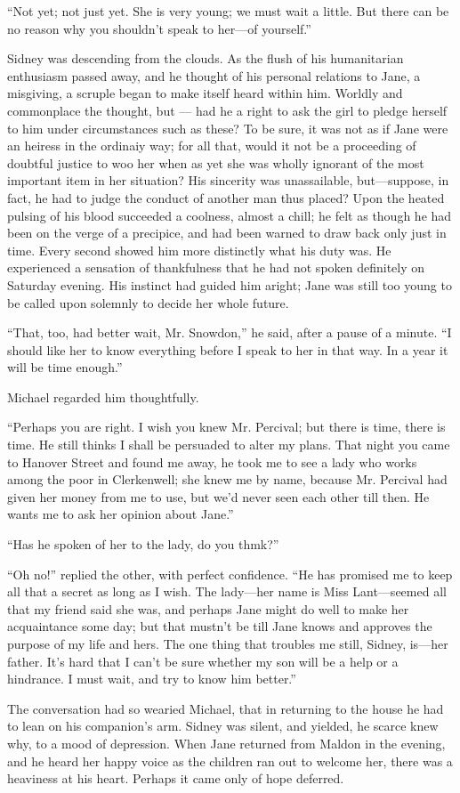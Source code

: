 {\protect\hypertarget{146}{}{}}``Not yet; not just yet. She is very
young; we must wait a little. But there can be no reason why you
shouldn't speak to her---of yourself.''

Sidney was descending from the clouds. As the flush of his humanitarian
enthusiasm passed away, and he thought of his personal relations to
Jane, a misgiving, a scruple began to make itself heard within him.
Worldly and commonplace the thought, but --- had he a right to ask the
girl to pledge herself to him under circumstances such as these? To be
sure, it was not as if Jane were an heiress in the ordinaiy way; for all
that, would it not be a proceeding of doubtful justice to woo her when
as yet she was wholly ignorant of the most important item in her
situation? His sincerity was unassailable, but---suppose, in fact, he
had to judge the conduct of another man thus placed? Upon the heated
pulsing of his blood succeeded a coolness, almost a chill; he felt as
though he had been on the verge of a precipice, and had been warned to
draw back {\protect\hypertarget{147}{}{}}only just in time. Every second
showed him more distinctly what his duty was. He experienced a sensation
of thankfulness that he had not spoken definitely on Saturday evening.
His instinct had guided him aright; Jane was still too young to be
called upon solemnly to decide her whole future.

``That, too, had better wait, Mr. Snowdon,'' he said, after a pause of a
minute. ``I should like her to know everything before I speak to her in
that way. In a year it will be time enough.''

Michael regarded him thoughtfully.

``Perhaps you are right. I wish you knew Mr. Percival; but there is
time, there is time. He still thinks I shall be persuaded to alter my
plans. That night you came to Hanover Street and found me away, he took
me to see a lady who works among the poor in Clerkenwell; she knew me by
name, because Mr. Percival had given her money from me to use, but we'd
never seen each other till then. He wants me to ask her opinion about
Jane.''

{\protect\hypertarget{148}{}{}}``Has he spoken of her to the lady, do
you thmk?''

``Oh no!'' replied the other, with perfect confidence. ``He has promised
me to keep all that a secret as long as I wish. The lady---her name is
Miss Lant---seemed all that my friend said she was, and perhaps Jane
might do well to make her acquaintance some day; but that mustn't be
till Jane knows and approves the purpose of my life and hers. The one
thing that troubles me still, Sidney, is---her father. It's hard that I
can't be sure whether my son will be a help or a hindrance. I must wait,
and try to know him better.''

The conversation had so wearied Michael, that in returning to the house
he had to lean on his companion's arm. Sidney was silent, and yielded,
he scarce knew why, to a mood of depression. When Jane returned from
Maldon in the evening, and he heard her happy voice as the children ran
out to welcome her, there was a heaviness at his heart. Perhaps it came
only of hope deferred.
